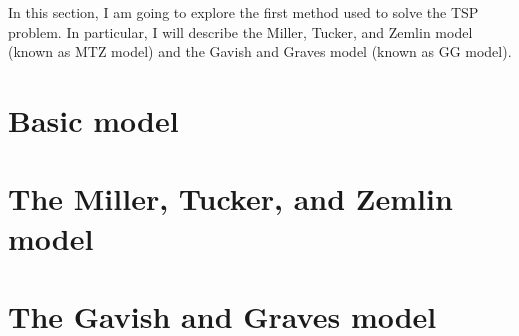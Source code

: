In this section, I am going to explore the first method used to solve the
TSP problem. In particular, I will describe the Miller, Tucker, and Zemlin model (known as MTZ model) and the Gavish and Graves model (known as GG model).

\section{Basic model}
\label{chapter:basic_model}


\section{The Miller, Tucker, and Zemlin model}
\label{chapter:mtz}


\section{The Gavish and Graves model}
